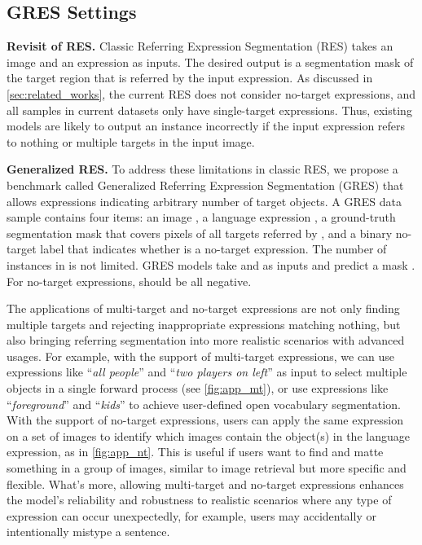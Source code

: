 \documentclass[10pt,twocolumn,letterpaper]{article}
\let\oldsubsection\subsection
\renewcommand{\subsection}[1]{\oldsubsection{#1} }
\begin{document}
\subsection{GRES Settings}
\textbf{Revisit of RES.} Classic Referring Expression Segmentation (RES) takes an image and an expression as inputs. The desired output is a segmentation mask of the target region that is referred by the input expression. As discussed in \cref{sec:related_works}, the current RES does not consider no-target expressions, and
all samples in current datasets only have single-target expressions. Thus, existing models are likely to output an instance incorrectly if the input expression refers to nothing or multiple targets in the input image.



\textbf{Generalized RES.} To address these limitations in classic RES, we propose a benchmark called Generalized Referring Expression Segmentation (GRES) that allows expressions indicating arbitrary number of target objects. A GRES data sample contains four items: an image , a language expression , a ground-truth segmentation mask  that covers pixels of all targets referred by , and a binary no-target label  that indicates whether  is a no-target expression. 
The number of instances in  is not limited. GRES models take  and  as inputs and predict a mask .
For no-target expressions,  should be all negative.

The applications of multi-target and no-target expressions are not only finding multiple targets and rejecting inappropriate expressions matching nothing, but also bringing referring segmentation into more realistic scenarios with advanced usages. For example, with the support of multi-target expressions, we can use expressions like ``\textit{all people}'' and ``\textit{two players on left}'' as input to select multiple objects in a single forward process (see \cref{fig:app_mt}), or use expressions like ``\textit{foreground}'' and ``\textit{kids}'' to achieve user-defined open vocabulary segmentation. With the support of no-target expressions, users can apply the same expression on a set of images to identify which images contain the object(s) in the language expression, as in \cref{fig:app_nt}. This is useful if users want to find and matte something in a group of images, similar to image retrieval but more specific and flexible. What's more, allowing multi-target and no-target expressions enhances the model's reliability and robustness to realistic scenarios where any type of expression can occur unexpectedly, for example, users may accidentally or intentionally mistype a sentence. 
\end{document}

